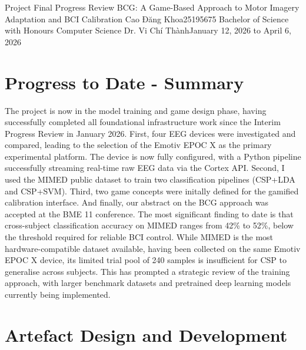 \documentclass[a4paper, 11pt, openany]{report}
\begin{document}
\reportTitlePage
    {Project Final Progress Review}
    {BCG: A Game-Based Approach to Motor Imagery Adaptation and BCI Calibration}
    {Cao Đăng Khoa}{25195675}
    {Bachelor of Science with Honours Computer Science}
    {Dr. Vi Chí Thành}{January 12, 2026 to April 6, 2026}
    \thispagestyle{titlepage}

\setcounter{page}{0}

\reportTableOfContents

\reportListOfFigures

\reportListOfTables


\cleardoublepage
{}

\setlength{\parskip}{8pt plus 2pt minus 1pt}


\chapter{Progress to Date - Summary}    
    The project is now in the model training and game design phase, having successfully completed all foundational 
    infrastructure work since the Interim Progress Review in January 2026.  
    First, four EEG devices were investigated and compared, leading to the selection of the Emotiv EPOC X as the 
    primary experimental platform. The device is now fully configured, with a Python pipeline successfully streaming 
    real-time raw EEG data via the Cortex API. 
    Second, I used the MIMED public dataset to train two classification pipelines (CSP+LDA and CSP+SVM).
    Third, two game concepts were initally defined for the gamified calibration interface. 
    And finally, our abstract on the BCG approach was accepted at the BME 11 
    conference. The most significant finding to date is that 
    cross-subject classification accuracy on MIMED ranges from 42\% to 52\%, below the threshold required for reliable 
    BCI control. While MIMED is the most hardware-compatible dataset available, having been collected on the same Emotiv 
    EPOC X device, its limited trial pool of 240 samples is insufficient for CSP to generalise across subjects. This has 
    prompted a strategic review of the training approach, with larger benchmark datasets and pretrained deep learning models 
    currently being implemented.

\chapter{Artefact Design and Development}
\end{document}
